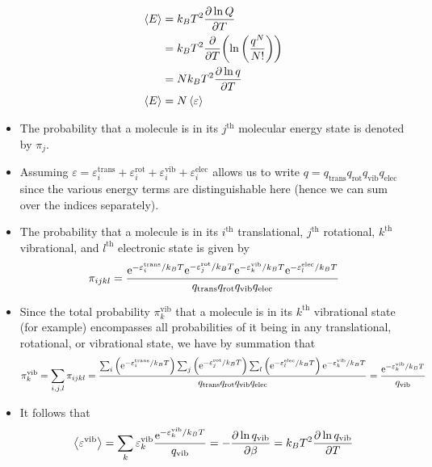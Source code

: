 \documentclass[../notes.tex]{subfiles}
\begin{document}
\begin{itemize}
    \begin{align*}
        \prb{E} &= k_BT^2\pdv{\ln Q}{T}\\
        &= k_BT^2\pdv{T}(\ln\left( \frac{q^N}{N!} \right))\\
        &= Nk_BT^2\pdv{\ln q}{T}\\
        \prb{E} &= N\prb{\varepsilon}
    \end{align*}
    \item The probability that a molecule is in its $j^\text{th}$ molecular energy state is denoted by $\pi_j$.
    \item Assuming $\varepsilon=\varepsilon_i^\text{trans}+\varepsilon_i^\text{rot}+\varepsilon_i^\text{vib}+\varepsilon_i^\text{elec}$ allows us to write $q=q_\text{trans}q_\text{rot}q_\text{vib}q_\text{elec}$ since the various energy terms are distinguishable here (hence we can sum over the indices separately).
    \item The probability that a molecule is in its $i^\text{th}$ translational, $j^\text{th}$ rotational, $k^\text{th}$ vibrational, and $l^\text{th}$ electronic state is given by
    \begin{equation*}
        \pi_{ijkl} = \frac{\e[-\varepsilon_i^\text{trans}/k_BT]\e[-\varepsilon_j^\text{rot}/k_BT]\e[-\varepsilon_k^\text{vib}/k_BT]\e[-\varepsilon_l^\text{elec}/k_BT]}{q_\text{trans}q_\text{rot}q_\text{vib}q_\text{elec}}
    \end{equation*}
    \item Since the total probability $\pi_k^\text{vib}$ that a molecule is in its $k^\text{th}$ vibrational state (for example) encompasses all probabilities of it being in any translational, rotational, or vibrational state, we have by summation that
    \begin{equation*}
        \pi_k^\text{vib} = \sum_{i,j,l}\pi_{ijkl}
        = \frac{\sum_i\left( \e[-\varepsilon_i^\text{trans}/k_BT] \right)\sum_j\left( \e[-\varepsilon_j^\text{rot}/k_BT] \right)\sum_l\left( \e[-\varepsilon_l^\text{elec}/k_BT] \right)\e[-\varepsilon_k^\text{vib}/k_BT]}{q_\text{trans}q_\text{rot}q_\text{vib}q_\text{elec}}
        = \frac{\e[-\varepsilon_k^\text{vib}/k_BT]}{q_\text{vib}}
    \end{equation*}
    \item It follows that
    \begin{equation*}
        \prb{\varepsilon^\text{vib}} = \sum_k\varepsilon_k^\text{vib}\frac{\e[-\varepsilon_k^\text{vib}/k_BT]}{q_\text{vib}}
        = -\pdv{\ln q_\text{vib}}{\beta}
        = k_BT^2\pdv{\ln q_\text{vib}}{T}

\end{equation*}
\end{itemize}
\end{document}

